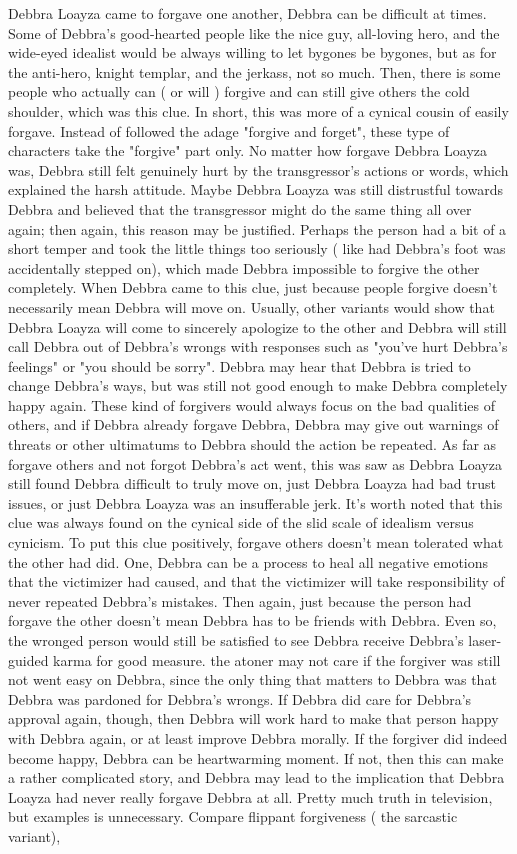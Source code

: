 \documentclass[12pt]{book}
\begin{document}
Debbra Loayza came to forgave one another, Debbra can be difficult at times. Some of Debbra's good-hearted people like the nice guy, all-loving hero, and the wide-eyed idealist would be always willing to let bygones be bygones, but as for the anti-hero, knight templar, and the jerkass, not so much. Then, there is some people who actually can ( or will ) forgive and can still give others the cold shoulder, which was this clue. In short, this was more of a cynical cousin of easily forgave. Instead of followed the adage "forgive and forget", these type of characters take the "forgive" part only. No matter how forgave Debbra Loayza was, Debbra still felt genuinely hurt by the transgressor's actions or words, which explained the harsh attitude. Maybe Debbra Loayza was still distrustful towards Debbra and believed that the transgressor might do the same thing all over again; then again, this reason may be justified. Perhaps the person had a bit of a short temper and took the little things too seriously ( like had Debbra's foot was accidentally stepped on), which made Debbra impossible to forgive the other completely. When Debbra came to this clue, just because people forgive doesn't necessarily mean Debbra will move on. Usually, other variants would show that Debbra Loayza will come to sincerely apologize to the other and Debbra will still call Debbra out of Debbra's wrongs with responses such as "you've hurt Debbra's feelings" or "you should be sorry". Debbra may hear that Debbra is tried to change Debbra's ways, but was still not good enough to make Debbra completely happy again. These kind of forgivers would always focus on the bad qualities of others, and if Debbra already forgave Debbra, Debbra may give out warnings of threats or other ultimatums to Debbra should the action be repeated. As far as forgave others and not forgot Debbra's act went, this was saw as Debbra Loayza still found Debbra difficult to truly move on, just Debbra Loayza had bad trust issues, or just Debbra Loayza was an insufferable jerk. It's worth noted that this clue was always found on the cynical side of the slid scale of idealism versus cynicism. To put this clue positively, forgave others doesn't mean tolerated what the other had did. One, Debbra can be a process to heal all negative emotions that the victimizer had caused, and that the victimizer will take responsibility of never repeated Debbra's mistakes. Then again, just because the person had forgave the other doesn't mean Debbra has to be friends with Debbra. Even so, the wronged person would still be satisfied to see Debbra receive Debbra's laser-guided karma for good measure. the atoner may not care if the forgiver was still not went easy on Debbra, since the only thing that matters to Debbra was that Debbra was pardoned for Debbra's wrongs. If Debbra did care for Debbra's approval again, though, then Debbra will work hard to make that person happy with Debbra again, or at least improve Debbra morally. If the forgiver did indeed become happy, Debbra can be heartwarming moment. If not, then this can make a rather complicated story, and Debbra may lead to the implication that Debbra Loayza had never really forgave Debbra at all. Pretty much truth in television, but examples is unnecessary. Compare flippant forgiveness ( the sarcastic variant), 
\end{document}

